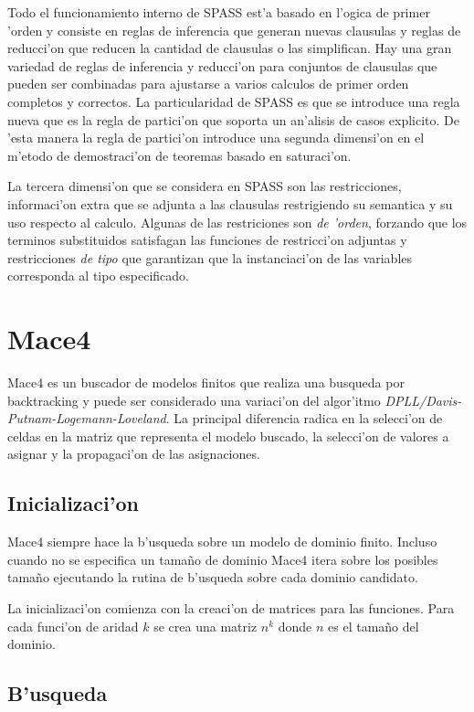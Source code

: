 Todo el funcionamiento interno de SPASS est'a basado en l'ogica de primer 'orden y consiste en reglas de inferencia que generan nuevas clausulas y reglas de reducci'on que reducen la cantidad de clausulas o las simplifican. Hay una gran variedad de reglas de inferencia y reducci'on para conjuntos de clausulas que pueden ser combinadas para ajustarse a varios calculos de primer orden completos y correctos. La particularidad de SPASS es que se introduce una regla nueva que es la regla de partici'on que soporta un an'alisis de casos explicito. De 'esta manera la regla de partici'on introduce una segunda dimensi'on en el m'etodo de demostraci'on de teoremas basado en saturaci'on.

La tercera dimensi'on que se considera en SPASS son las restricciones, informaci'on extra que se adjunta a las clausulas restrigiendo su semantica y su uso respecto al calculo. Algunas de las restriciones son \textit{de 'orden}, forzando que los terminos substituidos satisfagan las funciones de restricci'on adjuntas y restricciones \textit{de tipo} que garantizan que la instanciaci'on de las variables corresponda al tipo especificado.


\section{Mace4}

Mace4 es un buscador de modelos finitos que realiza una busqueda por backtracking y puede ser considerado una variaci'on del algor'itmo \textit{DPLL/Davis-Putnam-Logemann-Loveland}. La principal diferencia radica en la selecci'on de celdas en la matriz que representa el modelo buscado, la selecci'on de valores a asignar y la propagaci'on de las asignaciones.

\subsection{Inicializaci'on}

Mace4 siempre hace la b'usqueda sobre un modelo de dominio finito. Incluso cuando no se especifica un tamaño de dominio Mace4 itera sobre los posibles tamaño ejecutando la rutina de b'usqueda sobre cada dominio candidato.

La inicializaci'on comienza con la creaci'on de matrices para las funciones. Para cada funci'on de aridad $k$ se crea una matriz $n^k$ donde $n$ es el tamaño del dominio.

\subsection{B'usqueda}

